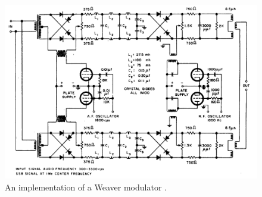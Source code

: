 \documentclass[12pt]{article}
\begin{document}
\pagebreak

\begin{figure}[h]
	\centering
	\includegraphics[width=.9\textwidth]{weaver-impl.png}
	\caption{An implementation of a Weaver modulator
	\autocite{weaver-himself}.}
	\label{fig:weaver-impl}
\end{figure}

\printbibliography
\end{document}
